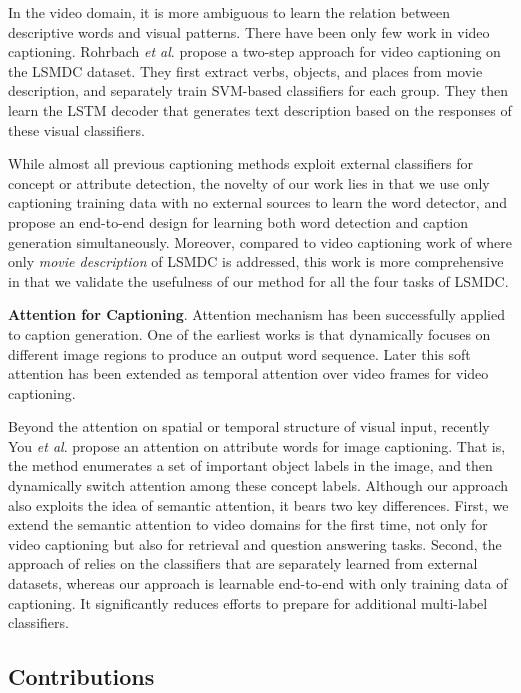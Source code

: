 \documentclass[10pt,twocolumn,letterpaper]{article}
\makeatletter
\theoremstyle{nonumberplain}
\DeclareRobustCommand\onedot{\futurelet\@let@token\@onedot}
\def\onedot{.\@\xspace}
\def\etal{\emph{et al}\onedot}
\makeatother
\begin{document}
In the video domain, it is more ambiguous to learn the relation between descriptive words and visual patterns.
There have been only few work in video captioning. Rohrbach \etal\cite{rohrbach-gcpr-2015} propose a two-step approach for video captioning on the LSMDC dataset.
They first extract verbs, objects, and places from movie description, and separately train SVM-based classifiers for each group.
They then learn the LSTM decoder that generates text description based on the responses of these visual classifiers.

While almost all previous captioning methods exploit external classifiers for concept or attribute detection,
the novelty of our work lies in that we use only captioning training data with no external sources to learn the word detector,
and propose an end-to-end design for learning both word detection and caption generation simultaneously.
Moreover, compared to video captioning work of \cite{rohrbach-gcpr-2015} where only \textit{movie description} of LSMDC is addressed,
this work is more comprehensive in that we validate the usefulness of our method for all the four tasks of LSMDC.

\textbf{Attention for Captioning}.
Attention mechanism has been successfully applied to caption generation.
One of the earliest works is \cite{xu-icml-2015} that dynamically focuses on different image regions to produce an output word sequence.
Later this soft attention has been extended as temporal attention over video frames \cite{yao-iccv-2015,yu-cvpr-2016} for video captioning.

Beyond the attention on spatial or temporal structure of visual input,
recently You \etal\cite{quanzeng-cvpr-2016} propose an attention on attribute words for image captioning.
That is, the method enumerates a set of important object labels in the image, and then dynamically switch attention among these concept labels.
Although our approach also exploits the idea of semantic attention, it bears two key differences.
First, we extend the semantic attention to video domains for the first time,
not only for video captioning but also for retrieval and question answering tasks.
Second, the approach of \cite{quanzeng-cvpr-2016} relies on the classifiers that are separately learned from external datasets,
whereas our approach is learnable end-to-end with only training data of captioning.
It significantly reduces  efforts to prepare for additional multi-label classifiers.

\subsection{Contributions}
\label{sec:contributions}
\end{document}
